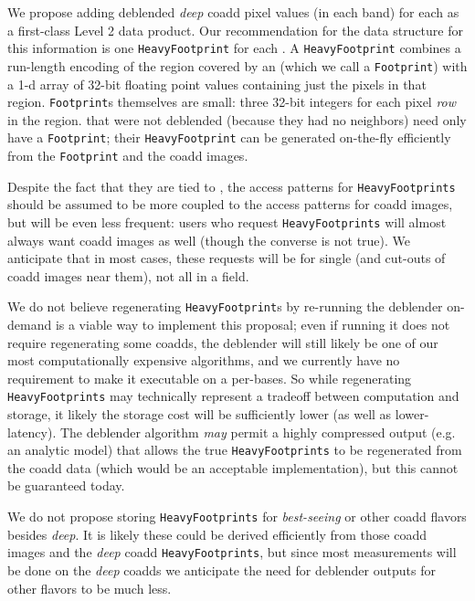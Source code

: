 \documentclass[DM,lsstdraft,toc]{lsstdoc}
\begin{document}
We propose adding deblended \emph{deep} coadd pixel values (in each band) for each \Object as a first-class Level 2 data product.  Our recommendation for the data structure for this information is one \texttt{HeavyFootprint} for each \Object.  A \texttt{HeavyFootprint} combines a run-length encoding of the region covered by an \Object (which we call a \texttt{Footprint}) with a 1-d array of 32-bit floating point values containing just the pixels in that region.  \texttt{Footprint}s themselves are small: three 32-bit integers for each pixel \emph{row} in the region.  \Objects that were not deblended (because they had no neighbors) need only have a \texttt{Footprint}; their \texttt{HeavyFootprint} can be generated on-the-fly efficiently from the \texttt{Footprint} and the coadd images.

Despite the fact that they are tied to \Objects, the access patterns for \texttt{HeavyFootprints} should be assumed to be more coupled to the access patterns for coadd images, but will be even less frequent: users who request \texttt{HeavyFootprints} will almost always want coadd images as well (though the converse is not true).  We anticipate that in most cases, these requests will be for single \Objects (and cut-outs of coadd images near them), not all \Objects in a field.

We do not believe regenerating \texttt{HeavyFootprint}s by re-running the deblender on-demand is a viable way to implement this proposal; even if running it does not require regenerating some coadds, the deblender will still likely be one of our most computationally expensive algorithms, and we currently have no requirement to make it executable on a per-\Object bases.  So while regenerating \texttt{HeavyFootprints} may technically represent a tradeoff between computation and storage, it likely the storage cost will be sufficiently lower (as well as lower-latency).  The deblender algorithm \emph{may} permit a highly compressed output (e.g. an analytic model) that allows the true \texttt{HeavyFootprints} to be regenerated from the coadd data (which would be an acceptable implementation), but this cannot be guaranteed today.

We do not propose storing \texttt{HeavyFootprints} for \emph{best-seeing} or other coadd flavors besides \emph{deep}.  It is likely these could be derived efficiently from those coadd images and the \emph{deep} coadd \texttt{HeavyFootprints}, but since most measurements will be done on the \emph{deep} coadds we anticipate the need for deblender outputs for other flavors to be much less.
\end{document}
